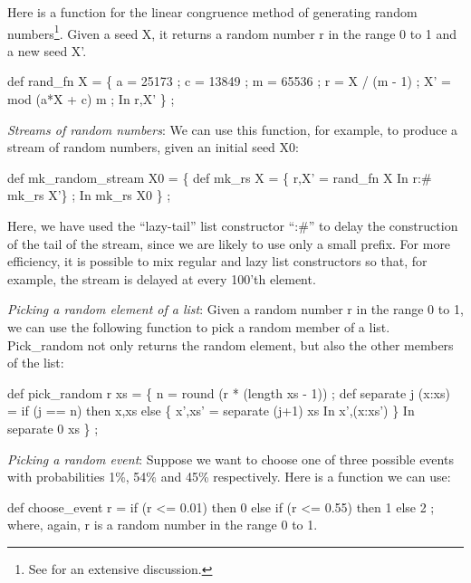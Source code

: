 \label{random-numbers}

Here is a function for the linear congruence method of generating
random numbers\footnote{
 See \cite{Knuth73b} for an extensive discussion.
 }.
 Given a seed {\cf X}, it returns a random
number {\cf r} in the range 0 to 1 and a new seed {\cf X'}.


 \beginid
def rand\_fn X =  \{ a = 25173 ; c = 13849 ; m = 65536 ;
                   r = X / (m - 1) ;
                   X' = mod (a*X + c) m ;
                 In
                   r,X' \} ;
\endid

{\em Streams of random numbers\/}: We can use this function, for
example, to produce a stream of random numbers, given an initial seed
{\cf X0}:

\beginid
def mk\_random\_stream X0 = \{ def mk\_rs X = \{ r,X' = rand\_fn X
                                          In
                                            r:# mk\_rs X'\} ;
                          In
                            mk\_rs X0 \} ;
\endid

Here, we have used the ``lazy-tail'' list constructor ``{\cf :\#}'' to
delay the construction of the tail of the stream, since we are likely
to use only a small prefix.  For more efficiency, it is possible to
mix regular and lazy list constructors so that, for example, the
stream is delayed at every 100'th element.

{\em Picking a random element of a list\/}: Given a random number {\cf
r} in the range 0 to 1, we can use the following function to pick a
random member of a list.  {\cf Pick\_random} not only returns the
random element, but also the other members of the list:

\beginid
def pick\_random r xs =
    \{ n = round (r * (length xs - 1)) ;
      def separate j (x:xs) = if (j == n) then
                                x,xs
                              else
                                \{ x',xs' = separate (j+1) xs
                                In
                                  x',(x:xs') \}
    In
      separate 0 xs \} ;
\endid

{\em Picking a random event\/}: Suppose we want to choose one of three
possible events with probabilities 1\%, 54\% and 45\% respectively.
Here is a function we can use:

 \beginid
def choose\_event r = if (r <= 0.01) then 0
                     else if (r <= 0.55) then 1
                     else 2 ;
 \endid
where, again, {\cf r} is a random number in the range 0 to 1.

